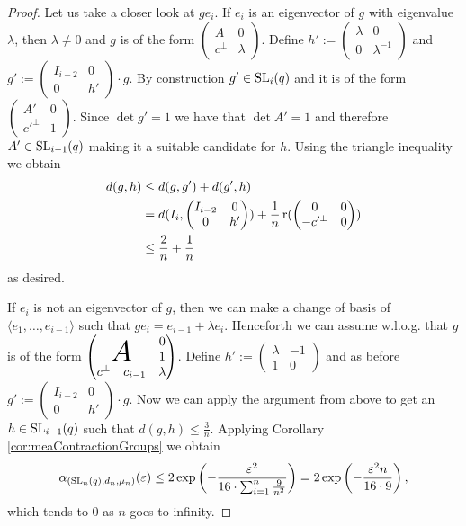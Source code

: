 \begin{proof}
Let us take a closer look at $ge_i$. If $e_i$ is an eigenvector of $g$ with eigenvalue $\lambda$, then $\lambda\not=0$ and $g$ is of the form 
$\begin{pmatrix}
A&0\\
c^\bot&\lambda
\end{pmatrix}$.
Define $h':=
\begin{pmatrix}
\lambda&0\\
0&\lambda^{-1}
\end{pmatrix}
$
and $g':=
\begin{pmatrix}
I_{i-2}&0\\
0&h'
\end{pmatrix}\cdot g$.
By construction $g'\in\operatorname{SL}_i(q)$ and it is of the form 
$\begin{pmatrix}
A'&0\\
c'^\bot&1
\end{pmatrix}$. Since $\det g'=1$ we have that $\det A'=1$ and therefore $A'\in\operatorname{SL}_{i-1}(q)$ making it a suitable candidate for $h$. Using the triangle inequality we obtain
\begin{align*}
d(g,h)&\leq d(g,g')+d(g',h)\\
&=d(I_i,\begin{pmatrix}
I_{i-2}&0\\
0&h'
\end{pmatrix})+\frac{1}{n}\operatorname{r}(\begin{pmatrix}
0&0\\
-c'^\bot&0
\end{pmatrix})\\
&\leq \frac{2}{n}+ \frac{1}{n}
\end{align*}
as desired.

If $e_i$ is not an eigenvector of $g$, then we can make a change of basis of $\langle e_1,\dots,e_{i-1}\rangle$ such that $ge_i=e_{i-1}+\lambda e_i$. Henceforth we can assume w.l.o.g. that $g$ is of the form 
$\begin{pmatrix}
&&0\\
\multicolumn{2}{c}
      {\raisebox{\dimexpr\normalbaselineskip+.2\ht\strutbox-0.9\height}[0pt][0pt]
        {\scalebox{2.3}{$A$}}} &1\\
c^\bot&c_{i-1}&\lambda
\end{pmatrix}
$.
Define $h':=
\begin{pmatrix}
\lambda&-1\\
1&0
\end{pmatrix}
$ and as before $g':=
\begin{pmatrix}
I_{i-2}&0\\
0&h'
\end{pmatrix}\cdot g$.
Now we can apply the argument from above to get an $h\in \operatorname{SL}_{i-1}(q)$ such that $d(g,h)\leq\frac{3}{n}$. Applying Corollary \ref{cor:meaContractionGroups} we obtain
\[\alpha_{(\operatorname{SL}_n(q), d_n, \mu_n)}(\varepsilon)\leq 2\exp\left(-\frac{\varepsilon^2}{16\cdot\sum_{i=1}^{n}\frac{9}{n^2}}\right)=2\exp\left(-\frac{\varepsilon^2 n}{16\cdot9}\right),\]
which tends to 0 as $n$ goes to infinity. 

\end{proof}

